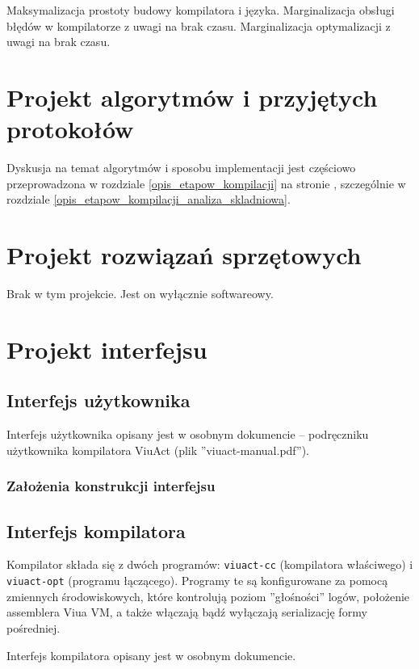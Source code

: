 Maksymalizacja prostoty budowy kompilatora i języka.
Marginalizacja obsługi błędów w kompilatorze z uwagi na brak czasu.
Marginalizacja optymalizacji z uwagi na brak czasu.

\section{Projekt algorytmów i przyjętych protokołów}

Dyskusja na temat algorytmów i sposobu implementacji jest częściowo przeprowadzona w rozdziale
\ref{opis_etapow_kompilacji} na stronie \pageref{opis_etapow_kompilacji}, szczególnie w rozdziale
\ref{opis_etapow_kompilacji_analiza_skladniowa}.

\section{Projekt rozwiązań sprzętowych}

Brak w tym projekcie. Jest on wyłącznie softwareowy.

\section{Projekt interfejsu}

\subsection{Interfejs użytkownika}

Interfejs użytkownika opisany jest w osobnym dokumencie -- podręczniku użytkownika kompilatora ViuAct (plik
''viuact-manual.pdf'').

\subsubsection{Założenia konstrukcji interfejsu}

\subsection{Interfejs kompilatora}

Kompilator składa się z dwóch programów: \texttt{viuact-cc} (kompilatora właściwego) i \texttt{viuact-opt}
(programu łączącego). Programy te są konfigurowane za pomocą zmiennych środowiskowych, które kontrolują poziom
''głośności'' logów, położenie assemblera Viua VM, a także włączają bądź wyłączają serializację formy
pośredniej.

Interfejs kompilatora opisany jest w osobnym dokumencie.

